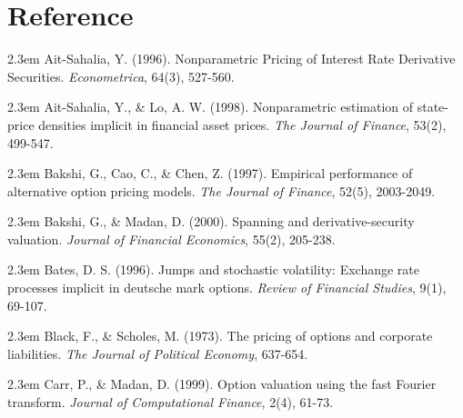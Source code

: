 \documentclass[oneside,english]{amsbook}
\numberwithin{section}{chapter}
\numberwithin{equation}{section}
\numberwithin{figure}{section}
\theoremstyle{plain}
\theoremstyle{plain}
\theoremstyle{definition}
\theoremstyle{plain}
\theoremstyle{plain}
\theoremstyle{remark}
\theoremstyle{definition}
\theoremstyle{definition}
\begin{document}










\appendix
\begingroup 
\let\clearpage\relax 

\endgroup




\chapter*{Reference}



\bigskip
\par\noindent\hangindent2.3em
Ait-Sahalia, Y. (1996). Nonparametric Pricing of Interest Rate Derivative Securities. {\em Econometrica}, 64(3), 527-560.

\par\noindent\hangindent2.3em
Ait-Sahalia, Y., \& Lo, A. W. (1998). Nonparametric estimation of state-price densities implicit in financial asset prices. {\em The Journal of Finance}, 53(2), 499-547.

\par\noindent\hangindent2.3em
Bakshi, G., Cao, C., \& Chen, Z. (1997). Empirical performance of alternative option pricing models. {\em The Journal of Finance}, 52(5), 2003-2049.

\par\noindent\hangindent2.3em
Bakshi, G., \& Madan, D. (2000). Spanning and derivative-security valuation. {\em Journal of Financial Economics}, 55(2), 205-238.

\par\noindent\hangindent2.3em
Bates, D. S. (1996). Jumps and stochastic volatility: Exchange rate processes implicit in deutsche mark options. {\em Review of Financial Studies}, 9(1), 69-107.

\par\noindent\hangindent2.3em
Black, F., \& Scholes, M. (1973). The pricing of options and corporate liabilities. {\em The Journal of Political Economy}, 637-654.

\par\noindent\hangindent2.3em
Carr, P., \& Madan, D. (1999). Option valuation using the fast Fourier transform. {\em Journal of Computational Finance}, 2(4), 61-73.
\end{document}
